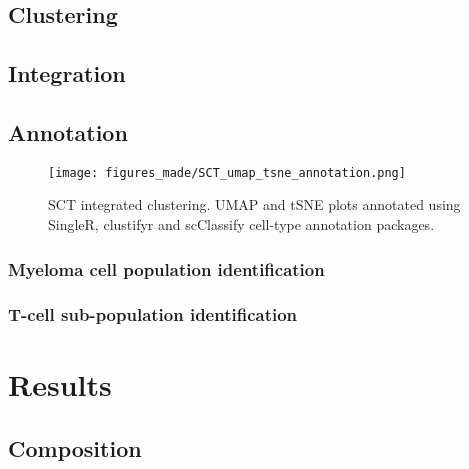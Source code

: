 \subsection{Clustering}

\subsection{Integration}

\subsection{Annotation}

\begin{figure}[h]
\centering
\texttt{[image: figures\_made/SCT\_umap\_tsne\_annotation.png]}
\caption[Single-cell annotation]{SCT integrated clustering. UMAP and tSNE plots annotated using SingleR, clustifyr and scClassify cell-type annotation packages.}
\label{fig:sc_annotation}
\end{figure}

\subsubsection{Myeloma cell population identification}

\subsubsection{T-cell sub-population identification}

\section{Results}

\subsection{Composition}

